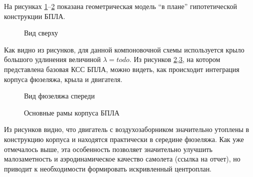 На рисунках 
\ref{fig:BPS_Catia_Top}--\ref{fig:BPS_Catia_Front} показана геометрическая модель ``в плане'' гипотетической конструкции БПЛА.


\begin{figure}[H]
\centering
\def\svgwidth{0.9\textwidth}

\caption{Вид сверху}
\label{fig:BPS_Catia_Top}
\end{figure}

Как видно из рисунков, для данной компоновочной схемы используется крыло большого удлинения величиной $\lambda = todo$. Из рисунков \ref{fig:BPS_Catia_Front},\ref{fig:BPS_Catia_WithoutSkin}, на котором представлена базовая КСС БПЛА, можно видеть, как происходит интеграция корпуса фюзеляжа, крыла и двигателя. 

\begin{figure}[H]
\centering

\caption{Вид фюзеляжа спереди}
\label{fig:BPS_Catia_Front}
\end{figure}


\begin{figure}[H]
\centering
\def\svgwidth{0.9\textwidth}

\caption{Основные рамы корпуса БПЛА}
\label{fig:BPS_Catia_WithoutSkin}
\end{figure}

Из рисунков видно, что двигатель с воздухозаборником значительно утоплены в конструкцию корпуса и находятся практически в середине фюзеляжа. Как уже отмечалось выше, эта особенность позволяет значительно улучшить малозаметность и аэродинамическое качество самолета (ссылка на отчет), но приводит к необходимости формировать искривленный центроплан. 

